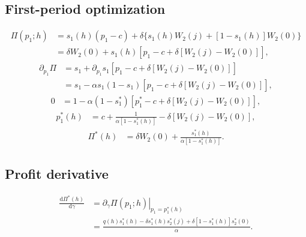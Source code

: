 \documentclass[11pt]{article}
\newcommand{\dd}{\mathrm{d}}
\begin{document}
\subsection{First-period optimization}
\begin{equation}
\begin{aligned}
\Pi(p_1;h)&=s_1(h)(p_1-c)+\delta\{s_1(h)W_2(j)+[1-s_1(h)]W_2(0)\}\\[3pt]
&=\delta W_2(0)+s_1(h)[p_1-c+\delta[W_2(j)-W_2(0)]],
\end{aligned}
\end{equation}
\begin{equation}
\begin{aligned}
\partial_{p_1}\Pi&=s_1+\partial_{p_1}s_1[p_1-c+\delta[W_2(j)-W_2(0)]]\\[3pt]
&=s_1-\alpha s_1(1-s_1)[p_1-c+\delta[W_2(j)-W_2(0)]],
\end{aligned}
\end{equation}
\begin{equation}
\begin{aligned}
0&=1-\alpha(1-s_1^*)[p_1^*-c+\delta[W_2(j)-W_2(0)]],
\end{aligned}
\end{equation}
\begin{equation}
\begin{aligned}
p_1^*(h)&=c+\frac1{\alpha[1-s_1^*(h)]}-\delta[W_2(j)-W_2(0)],
\end{aligned}
\end{equation}
\begin{equation}
\begin{aligned}
\Pi^*(h)&=\delta W_2(0)+\frac{s_1^*(h)}{\alpha[1-s_1^*(h)]}.
\end{aligned}
\end{equation}

\subsection{Profit derivative}
\begin{equation}
\begin{aligned}
\frac{\dd\Pi^*(h)}{\dd\gamma}
&=\left.\partial_\gamma\Pi(p_1;h)\right|_{p_1=p_1^*(h)}\\[3pt]
&=\frac{q(h)s_1^*(h)-\delta s_1^*(h)s_2^*(j)
 +\delta[1-s_1^*(h)]s_2^*(0)}{\alpha}.
\end{aligned}
\end{equation}
\end{document}
